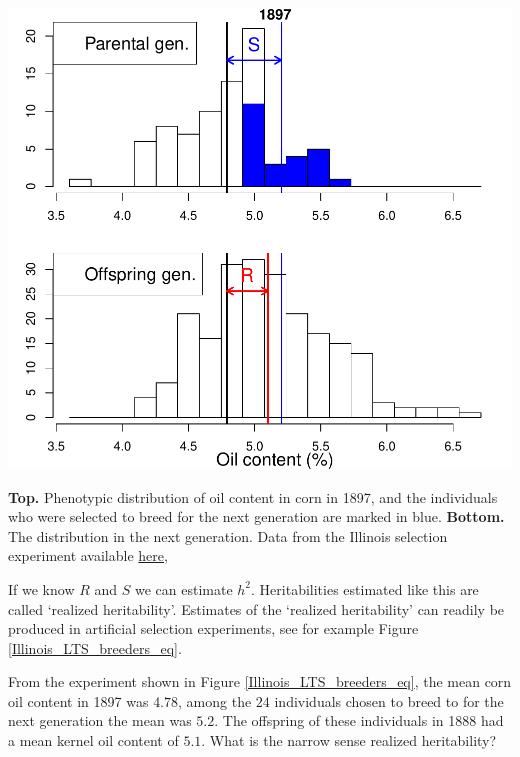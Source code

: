 \begin{marginfigure}
\begin{center}
\includegraphics[width=\textwidth]{Journal_figs/Quant_gen/Illinois_long_term_selection_corn/Illinois_LTS_breeders_eq.pdf}
\end{center}
\caption{{\bf Top.} Phenotypic distribution of oil content in corn in
  1897, and the individuals who were selected to breed for the next
  generation are marked in blue.   {\bf Bottom.} The distribution in the next generation. Data from the
  Illinois selection experiment available \href{https://www.ideals.illinois.edu/handle/2142/3525}{here}, }  \label{Fig:s}
\end{marginfigure}

If we know $R$ and $S$ we can estimate $h^2$. Heritabilities estimated
like this are called `realized heritability'. Estimates of the
`realized heritability' can readily be produced in artificial selection experiments, see for example Figure \ref{Illinois_LTS_breeders_eq}.
\begin{question}
  From the experiment shown in Figure \ref{Illinois_LTS_breeders_eq},
  the mean corn oil content in 1897 was $4.78$, among the $24$ individuals
chosen to breed to for the next generation the mean was $5.2$. The
offspring of these individuals in 1888 had a mean kernel oil content of
$5.1$. What is the narrow sense realized heritability? 
\end{question}

